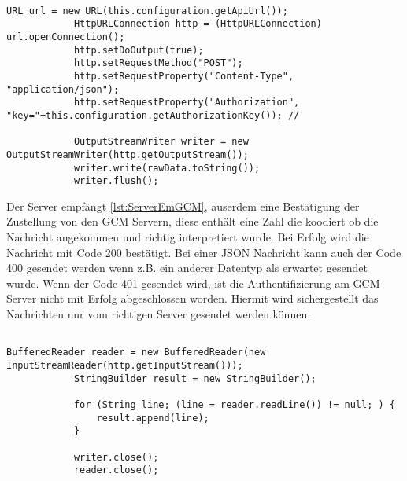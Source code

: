 \begin{lstlisting}[caption={Senden von Nachrichten vom Server},label=lst:ServerSeGCM]

URL url = new URL(this.configuration.getApiUrl());
			HttpURLConnection http = (HttpURLConnection) url.openConnection();
			http.setDoOutput(true);
			http.setRequestMethod("POST");
			http.setRequestProperty("Content-Type", "application/json");
			http.setRequestProperty("Authorization", "key="+this.configuration.getAuthorizationKey()); //
			
			OutputStreamWriter writer = new OutputStreamWriter(http.getOutputStream());
			writer.write(rawData.toString());
			writer.flush();

\end{lstlisting}

Der Server empfängt \ref{lst:ServerEmGCM}, auserdem eine Bestätigung der Zustellung von den GCM Servern, diese enthält eine Zahl die koodiert ob die Nachricht angekommen und richtig interpretiert wurde. Bei Erfolg wird die Nachricht mit Code 200 bestätigt. Bei einer JSON Nachricht kann auch der Code 400 gesendet werden wenn z.B. ein anderer Datentyp als erwartet gesendet wurde. Wenn der Code 401 gesendet wird, ist die Authentifizierung am GCM Server nicht mit Erfolg abgeschlossen worden. Hiermit wird sichergestellt das Nachrichten nur vom richtigen Server gesendet werden können. 


\begin{lstlisting}[caption={Empfangen von Bestätigungen am Server},label=lst:ServerEmGCM]

BufferedReader reader = new BufferedReader(new InputStreamReader(http.getInputStream()));
			StringBuilder result = new StringBuilder();
			
			for (String line; (line = reader.readLine()) != null; ) {
				result.append(line);
			}

			writer.close();
			reader.close();

\end{lstlisting}
